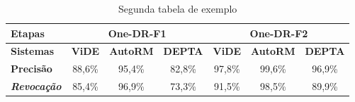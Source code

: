 \begin{table}[hbt]
\centering
\caption{Segunda tabela de exemplo}
\label{tab:author-one-dr}
\begin{tabular}{lcccccc}
\hline
\multicolumn{1}{l|}{\textbf{Etapas}}   & \multicolumn{3}{c|}{\textbf{One-DR-F1}}                                                                         & \multicolumn{3}{c}{\textbf{One-DR-F2}}                                                    \\ \hline
\multicolumn{1}{l|}{\textbf{Sistemas}} & \multicolumn{1}{c|}{\textbf{ViDE}} & \multicolumn{1}{c|}{\textbf{AutoRM}} & \multicolumn{1}{c|}{\textbf{DEPTA}} & \multicolumn{1}{c|}{\textbf{ViDE}} & \multicolumn{1}{c|}{\textbf{AutoRM}} & \textbf{DEPTA} \\ \hline
\textbf{Precisão}& 88,6\%   & 95,4\%   & 82,8\%   & 97,8\%   & 99,6\%   & 96,9\%   \\
\textit{\textbf{Revocação}}& 85,4\%   & 96,9\%   & 73,3\%   & 91,5\%   & 98,5\%   & 89,9\%   \\ \hline
\end{tabular}
\end{table}
